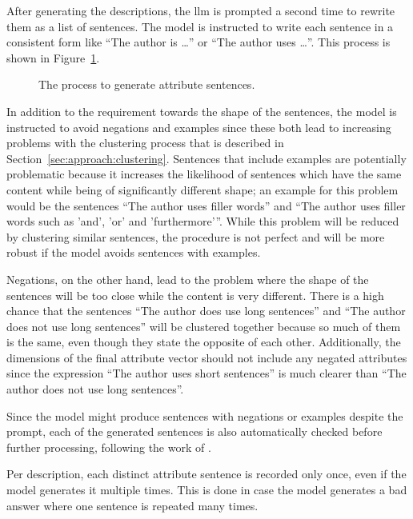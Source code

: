 After generating the descriptions, the \ac{llm} is prompted a second time to rewrite them as a list of sentences. The model is instructed to write each sentence in a consistent form like \enquote{The author is \ldots} or \enquote{The author uses \ldots}. This process is shown in Figure~\ref{fig:attributeSentenceGeneration}.

\begin{figure}[ht]
  
  \caption{The process to generate attribute sentences.}
  \label{fig:attributeSentenceGeneration}
\end{figure}

In addition to the requirement towards the shape of the sentences, the model is instructed to avoid negations and examples since these both lead to increasing problems with the clustering process that is described in Section~\ref{sec:approach:clustering}.
Sentences that include examples are potentially problematic because it increases the likelihood of sentences which have the same content while being of significantly different shape; an example for this problem would be the sentences \enquote{The author uses filler words} and \enquote{The author uses filler words such as 'and', 'or' and 'furthermore'}. While this problem will be reduced by clustering similar sentences, the procedure is not perfect and will be more robust if the model avoids sentences with examples.

Negations, on the other hand, lead to the problem where the shape of the sentences will be too close while the content is very different. There is a high chance that the sentences \enquote{The author does use long sentences} and \enquote{The author does not use long sentences} will be clustered together because so much of them is the same, even though they state the opposite of each other.
Additionally, the dimensions of the final attribute vector should not include any negated attributes since the expression \enquote{The author uses short sentences} is much clearer than \enquote{The author does not use long sentences}.

Since the model might produce sentences with negations or examples despite the prompt, each of the generated sentences is also automatically checked before further processing, following the work of \citet{patelLearningInterpretableStyle2023}.

Per description, each distinct attribute sentence is recorded only once, even if the model generates it multiple times. This is done in case the model generates a bad answer where one sentence is repeated many times.


